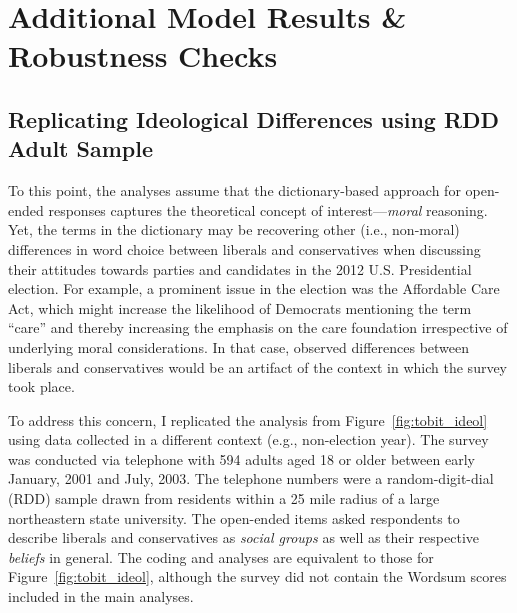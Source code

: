 \documentclass[12pt]{article}
\begin{document}
\clearpage
\section{Additional Model Results \& Robustness Checks}\label{app:robust}
\renewcommand\thefigure{\thesection.\arabic{figure}}
\renewcommand\thetable{\thesection.\arabic{table}}
\setcounter{figure}{0}
\setcounter{table}{0}



\subsection{Replicating Ideological Differences using RDD Adult Sample}


To this point, the analyses assume that the dictionary-based approach for open-ended responses captures the theoretical concept of interest---\textit{moral} reasoning. Yet, the terms in the dictionary may be recovering other (i.e., non-moral) differences in word choice between liberals and conservatives when discussing their attitudes towards parties and candidates in the 2012 U.S. Presidential election. For example, a prominent issue in the election was the Affordable Care Act, which might increase the likelihood of Democrats mentioning the term ``care'' and thereby increasing the emphasis on the care foundation irrespective of underlying moral considerations. In that case, observed differences between liberals and conservatives would be an artifact of the context in which the survey took place.

To address this concern, I replicated the analysis from Figure~\ref{fig:tobit_ideol} using data collected in a different context (e.g., non-election year). The survey was conducted via telephone with 594 adults aged 18 or older between early January, 2001 and July, 2003. The telephone numbers were a random-digit-dial (RDD) sample drawn from residents within a 25 mile radius of a large northeastern state university. The open-ended items asked respondents to describe liberals and conservatives as \textit{social groups} as well as their respective \textit{beliefs} in general. The coding and analyses are equivalent to those for Figure~\ref{fig:tobit_ideol}, although the survey did not contain the Wordsum scores included in the main analyses.
\end{document}
